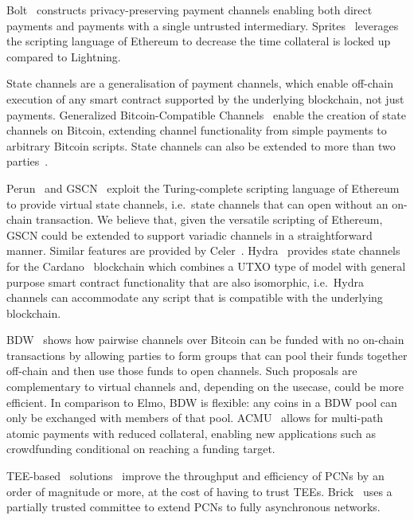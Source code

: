   Bolt~\cite{10.1145/3133956.3134093} constructs privacy-preserving payment
  channels enabling both direct payments and payments with a single untrusted
  intermediary. Sprites~\cite{sprites} leverages the scripting language of
  Ethereum to decrease the time collateral is locked up compared to Lightning.

  State channels are a generalisation of payment channels, which enable
  off-chain execution of any smart contract supported by the underlying
  blockchain, not just payments. Generalized Bitcoin-Compatible
  Channels~\cite{DBLP:journals/iacr/AumayrEEFHMMR20} enable the creation of
  state channels on Bitcoin, extending channel functionality from simple
  payments to arbitrary Bitcoin scripts. State channels can also be extended to
  more than two
  parties~\cite{DBLP:conf/asiaccs/LiaoZSS22,DBLP:conf/eurocrypt/DziembowskiEFHH19}.

  Perun~\cite{perun} and GSCN~\cite{DBLP:conf/ccs/DziembowskiFH18} exploit the
  Turing-complete scripting language of Ethereum to provide virtual state
  channels, i.e.\ state channels that can open without an on-chain transaction.
  We believe that, given the versatile scripting of Ethereum, GSCN could be
  extended to support variadic channels in a straightforward manner. Similar
  features are provided by Celer~\cite{dong2018celer}.
  Hydra~\cite{cryptoeprint:2020:299} provides state channels for the
  Cardano~\cite{cardano} blockchain which combines a UTXO type of model with
  general purpose smart contract functionality that are also isomorphic, i.e.\
  Hydra channels can accommodate any script that is compatible with the
  underlying blockchain.

  BDW~\cite{scalable-funding} shows how pairwise channels over Bitcoin can be
  funded with no on-chain transactions by allowing parties to form groups that
  can pool their funds together off-chain and then use those funds to open
  channels. Such proposals are complementary to virtual channels and, depending
  on the usecase, could be more efficient. In comparison to Elmo, BDW is
  flexible: any coins in a BDW pool can only be exchanged with members of that
  pool. ACMU~\cite{10.1145/3319535.3345666} allows for multi-path atomic
  payments with reduced collateral, enabling new applications such as
  crowdfunding conditional on reaching a funding target.

  TEE-based~\cite{zhao2019sok}
solutions~\cite{teechan,10.1145/3341301.3359627,liao2021speedster,lee2020routee}
  improve the throughput and efficiency of PCNs by an order of magnitude or
  more, at the cost of having to trust TEEs. Brick~\cite{avarikioti2020brick}
  uses a partially trusted committee to extend PCNs to fully asynchronous
  networks.

